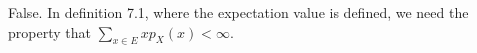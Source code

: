 
False. In definition 7.1, where the expectation value is defined, we need the property that $
\sum_{x\in E}^{} x p_{X} (x) < \infty$.  
